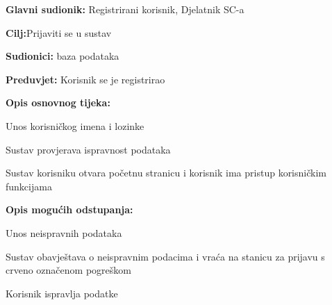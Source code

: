 \noindent {}
\begin{packed_item}
	
	\item \textbf{Glavni sudionik: }Registrirani korisnik, Djelatnik SC-a
	\item  \textbf{Cilj:}Prijaviti se u sustav
	\item  \textbf{Sudionici:} baza podataka
	\item  \textbf{Preduvjet:} Korisnik se je registrirao
	\item  \textbf{Opis osnovnog tijeka:}
	
	\item[] \begin{packed_enum}
		
		\item Unos korisničkog imena i lozinke
		\item Sustav provjerava ispravnost podataka
		\item Sustav korisniku otvara početnu stranicu i korisnik ima pristup korisničkim funkcijama
	\end{packed_enum}
	
	\item  \textbf{Opis mogućih odstupanja:}
	
	\item[] \begin{packed_item}
		
		\item[2.a] Unos neispravnih podataka
		\item[] \begin{packed_enum}
			
			\item  Sustav obavještava o neispravnim podacima i vraća na stanicu za prijavu s crveno označenom pogreškom
			\item Korisnik ispravlja podatke
			
			
		\end{packed_enum}
		
	\end{packed_item}
\end{packed_item}

